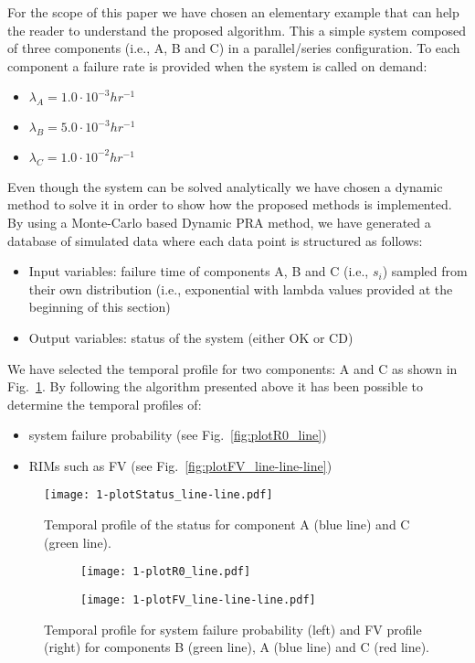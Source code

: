 For the scope of this paper we have chosen an elementary example that can help the reader to 
understand the proposed algorithm. This a simple system composed of three components 
(i.e., A, B and C) in a parallel/series configuration. To each component a failure rate is 
provided when the system is called on demand:
\begin{itemize}
  \item $\lambda_A=1.0 \cdot 10^{-3} hr^{-1}$
  \item $\lambda_B=5.0 \cdot 10^{-3} hr^{-1}$
  \item $\lambda_C=1.0 \cdot 10^{-2} hr^{-1}$
\end{itemize}
  
Even though the system can be solved analytically we have chosen a dynamic method to solve it in 
order to show how the proposed methods is implemented. 
By using a Monte-Carlo based Dynamic PRA method, we have generated a database of simulated data 
where each data point is structured as follows:
\begin{itemize}
  \item Input variables: failure time of components A, B and C (i.e., $s_i$) sampled from their 
        own distribution (i.e., exponential with lambda values provided at the beginning of this section)
  \item Output variables: status of the system (either OK or CD)
\end{itemize}

We have selected the temporal profile for two components: A and C as shown in Fig.~\ref{fig:plotStatus_line-line}. 
By following the algorithm presented above it has been possible to determine the temporal profiles of:
\begin{itemize}
  \item system failure probability (see Fig.~\ref{fig:plotR0_line})
  \item RIMs such as FV (see Fig.~\ref{fig:plotFV_line-line-line}) 
\end{itemize}

\begin{figure}
    \centering
    \centerline{\texttt{[image: 1-plotStatus\_line-line.pdf]}}
    \caption{Temporal profile of the status for component A (blue line) and C (green line).}
    \label{fig:plotStatus_line-line}
\end{figure}

\begin{figure}
  \centering
  \begin{subfigure}{.5\textwidth}
    \centering
    \centerline{\texttt{[image: 1-plotR0\_line.pdf]}}
  \end{subfigure}%
  \begin{subfigure}{.5\textwidth}
    \centering
    \centerline{\texttt{[image: 1-plotFV\_line-line-line.pdf]}}
  \end{subfigure}
  \caption{Temporal profile for system failure probability (left) and FV profile (right) for 
           components B (green line), A (blue line) and C (red line).}
  \label{fig:margin0}
\end{figure}



